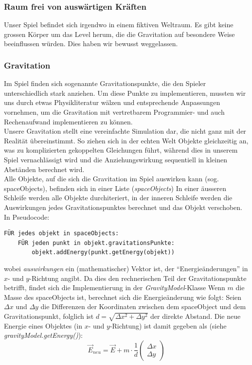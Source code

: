 \documentclass[12pt,a4paper]{scrartcl}
\newcommand{\q}[1]{``#1''}
\begin{document}
\subsubsection{Raum frei von auswärtigen Kräften}
Unser Spiel befindet sich irgendwo in einem fiktiven Weltraum. Es gibt keine grossen Körper um das
Level herum, die die Gravitation auf besondere Weise beeinflussen würden. Dies haben wir bewusst weggelassen.


\subsubsection{Gravitation}
Im Spiel finden sich sogenannte Gravitationspunkte, die den Spieler unterschiedlich stark anziehen.
Um diese Punkte zu implementieren, mussten wir uns durch etwas Physikliteratur wälzen und entsprechende
Anpassungen vornehmen, um die Gravitation mit vertretbarem Programmier- und auch Rechenaufwand implementieren zu können.  \\

Unsere Gravitation stellt eine vereinfachte Simulation dar, die nicht ganz mit der Realität übereinstimmt.
So ziehen sich in der echten Welt Objekte gleichzeitig an, was zu komplizierten gekoppelten Gleichungen führt, während dies in
unserem Spiel vernachlässigt wird und die Anziehungswirkung sequentiell in kleinen Abständen berechnet wird.\\

Alle Objekte, auf die sich die Gravitation im Spiel auswirken kann (sog. spaceObjects), befinden sich in einer Liste (\textit{spaceObjects})
In einer äusseren Schleife werden alle Objekte durchiteriert, in der inneren Schleife werden die Auswirkungen jedes Gravitationspunktes berechnet und
das Objekt verschoben. In Pseudocode:
\begin{verbatim}
FÜR jedes objekt in spaceObjects:
    FÜR jeden punkt in objekt.gravitationsPunkte:
        objekt.addEnergy(punkt.getEnergy(objekt))
\end{verbatim}

wobei \textit{auswirkungen} ein (mathematischer) Vektor ist, der \q{Energieänderungen} in $x$- und $y$-Richtung angibt.
Da dies den rechnerischen Teil der Gravitationspunkte betrifft, findet sich die Implementierung in der \textit{GravityModel}-Klasse
Wenn $m$ die Masse des spaceObjects ist, berechnet sich die Energieänderung wie folgt:
Seien $\Delta x$ und $\Delta y$ die Differenzen der Koordinaten zwischen dem spaceObject und dem Gravitationspunkt,
folglich ist $d = \sqrt{\Delta x^2 + \Delta y^2}$ der direkte Abstand. Die neue Energie eines Objektes (in $x$- und $y$-Richtung)
ist damit gegeben als (siehe \textit{gravityModel.getEnergy()}): 
\[ \vec{E}_{neu} = \vec{E} + m \cdot \frac{1}{d} \begin{pmatrix}\Delta x \\ \Delta y\end{pmatrix} \]
\end{document}
